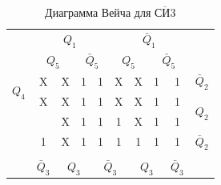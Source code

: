 \documentclass[a4paper,14pt]{article}
\begin{document}
\begin{table}[H]
	\begin{center}
		\caption{\label{tab:SN3_tab} Диаграмма Вейча для $\overline{\text{СИ}3}$ }
	\begin{tabular}{cccccccccc}
		& \multicolumn{4}{c}{$Q_1$} & \multicolumn{4}{c}{$\bar{Q}_1$} &  \\
		& \multicolumn{2}{c}{$Q_5$} & \multicolumn{2}{c}{$\bar{Q}_5$} & \multicolumn{2}{c}{$Q_5$} & \multicolumn{2}{c}{$\bar{Q}_5$} &  \\ \cline{2-9}
		\multicolumn{1}{c|}{\multirow{2}{*}{$Q_4$}} & \multicolumn{1}{c|}{X} & \multicolumn{1}{c|}{X} & \multicolumn{1}{c|}{1} & \multicolumn{1}{c|}{1} & \multicolumn{1}{c|}{X} & \multicolumn{1}{c|}{X} & \multicolumn{1}{c|}{1} & \multicolumn{1}{c|}{1} & $\bar{Q}_2$ \\ \cline{2-9}
		\multicolumn{1}{c|}{} & \multicolumn{1}{c|}{X} & \multicolumn{1}{c|}{X} & \multicolumn{1}{c|}{1} & \multicolumn{1}{c|}{1} & \multicolumn{1}{c|}{X} & \multicolumn{1}{c|}{X} & \multicolumn{1}{c|}{1} & \multicolumn{1}{c|}{1} & \multirow{2}{*}{$Q_2$} \\ \cline{2-9}
		\multicolumn{1}{c|}{\multirow{2}{*}{}} & \multicolumn{1}{c|}{} & \multicolumn{1}{c|}{X} & \multicolumn{1}{c|}{1} & \multicolumn{1}{c|}{1} & \multicolumn{1}{c|}{1} & \multicolumn{1}{c|}{X} & \multicolumn{1}{c|}{1} & \multicolumn{1}{c|}{1} &  \\ \cline{2-9}
		\multicolumn{1}{c|}{} & \multicolumn{1}{c|}{1} & \multicolumn{1}{c|}{X} & \multicolumn{1}{c|}{1} & \multicolumn{1}{c|}{1} & \multicolumn{1}{c|}{1} & \multicolumn{1}{c|}{1} & \multicolumn{1}{c|}{1} & \multicolumn{1}{c|}{1} & $\bar{Q}_2$ \\ \cline{2-9}
		&  & \multicolumn{2}{c}{} & \multicolumn{2}{c}{} & \multicolumn{2}{c}{} &  &  \\
		& $\bar{Q}_3$ & \multicolumn{2}{c}{$Q_3$} & \multicolumn{2}{c}{$\bar{Q}_3$} & \multicolumn{2}{c}{$Q_3$} & $\bar{Q}_3$ & 
	\end{tabular}
	\end{center}
\end{table}


\end{document}
